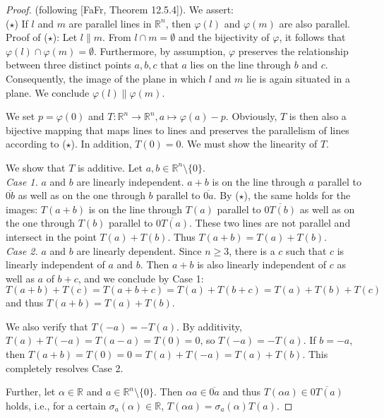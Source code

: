 \documentclass[11pt,a4paper]{article}
\newcommand{\lineab}[1]{\overline{#1}}
\begin{document}
\begin{proof}
(following [FaFr, Theorem 12.5.4]). We assert: \\
($\star$) If $l$ and $m$ are parallel lines in $\mathbb{R}^n$, then $\varphi(l)$ and $\varphi(m)$ are also parallel. \\
Proof of ($\star$): Let $l \parallel m$. From $l \cap m = \emptyset$ and the bijectivity of $\varphi$, it follows that $\varphi(l) \cap \varphi(m) = \emptyset$. Furthermore, by assumption, $\varphi$ preserves the relationship between three distinct points $a, b, c$ that $a$ lies on the line through $b$ and $c$. Consequently, the image of the plane in which $l$ and $m$ lie is again situated in a plane. We conclude $\varphi(l) \parallel \varphi(m)$.

We set $p = \varphi(0)$ and $T: \mathbb{R}^n \to \mathbb{R}^n, a \mapsto \varphi(a) - p$. Obviously, $T$ is then also a bijective mapping that maps lines to lines and preserves the parallelism of lines according to ($\star$). In addition, $T(0) = 0$. We must show the linearity of $T$.

We show that $T$ is additive. Let $a, b \in \mathbb{R}^n \setminus \{0\}$. \\
\textit{Case 1.} $a$ and $b$ are linearly independent. $a + b$ is on the line through $a$ parallel to $\lineab{0b}$ as well as on the one through $b$ parallel to $\lineab{0a}$. By ($\star$), the same holds for the images: $T(a + b)$ is on the line through $T(a)$ parallel to $\lineab{0T(b)}$ as well as on the one through $T(b)$ parallel to $\lineab{0T(a)}$. These two lines are not parallel and intersect in the point $T(a) + T(b)$. Thus $T(a + b) = T(a) + T(b)$. \\
\textit{Case 2.} $a$ and $b$ are linearly dependent. Since $n \ge 3$, there is a $c$ such that $c$ is linearly independent of $a$ and $b$. Then $a + b$ is also linearly independent of $c$ as well as $a$ of $b + c$, and we conclude by Case 1:
\[ T(a + b) + T(c) = T(a + b + c) = T(a) + T(b + c) = T(a) + T(b) + T(c) \]
and thus $T(a + b) = T(a) + T(b)$.

We also verify that $T(-a) = -T(a)$. By additivity, $T(a) + T(-a) = T(a - a) = T(0) = 0$, so $T(-a) = -T(a)$. If $b = -a$, then $T(a+b) = T(0) = 0 = T(a) + T(-a) = T(a) + T(b)$. This completely resolves Case 2.

Further, let $\alpha \in \mathbb{R}$ and $a \in \mathbb{R}^n \setminus \{0\}$. Then $\alpha a \in \lineab{0a}$ and thus $T(\alpha a) \in \lineab{0T(a)}$ holds, i.e., for a certain $\sigma_a(\alpha) \in \mathbb{R}$, $T(\alpha a) = \sigma_a(\alpha)T(a)$.


\end{proof}
\end{document}

